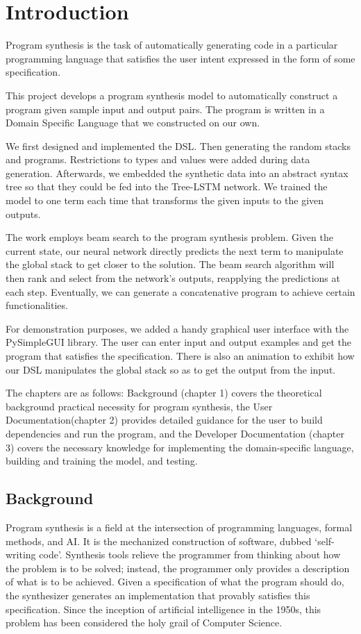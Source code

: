 \chapter{Introduction}

Program synthesis is the task of automatically generating code in a particular programming language that satisfies the user intent expressed in the form of some specification. 

This project develops a program synthesis model to automatically construct a program given sample input and output pairs. The program is written in a Domain Specific Language that we constructed on our own.

We first designed and implemented the DSL. Then generating the random stacks and programs. Restrictions to types and values were added during data generation. Afterwards, we embedded the synthetic data into an abstract syntax tree so that they could be fed into the Tree-LSTM network. We trained the model to one term each time that transforms the given inputs to the given outputs. 

The work employs beam search to the program synthesis problem. Given the current state, our neural network directly predicts the next term to manipulate the global stack to get closer to the solution. The beam search algorithm will then rank and select from the network’s outputs, reapplying the predictions at each step. Eventually, we can generate a concatenative program to achieve certain functionalities.

For demonstration purposes, we added a handy graphical user interface with the PySimpleGUI library. The user can enter input and output examples and get the program that satisfies the specification. There is also an animation to exhibit how our DSL manipulates the global stack so as to get the output from the input.

The chapters are as follows: Background (chapter 1) covers the theoretical background practical necessity for program synthesis, the User Documentation(chapter 2) provides detailed guidance for the user to build dependencies and run the program, and the Developer Documentation (chapter 3) covers the necessary knowledge for implementing the domain-specific language, building and training the model, and testing.

\section{Background}
Program synthesis is a field at the intersection of programming languages, formal methods, and AI. It is the mechanized construction of software, dubbed ‘self-writing code’. Synthesis tools relieve the programmer from thinking about how the problem is to be solved; instead, the programmer only provides a description of what is to be achieved. Given a specification of what the program should do, the synthesizer generates an implementation that provably satisfies this specification. Since the inception of artificial intelligence in the 1950s, this problem has been considered the holy grail of Computer Science.\cite{progsynth}

